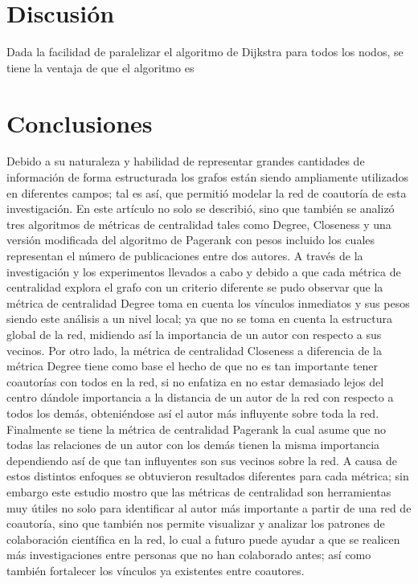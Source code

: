 \documentclass[journal]{IEEEtran}
\begin{document}
\section{Discusión}

Dada la facilidad de paralelizar el algoritmo de Dijkstra para todos los nodos, se tiene la ventaja de que el algoritmo es 

\section{Conclusiones}

Debido a su naturaleza y habilidad de representar grandes cantidades de información de forma estructurada los grafos están siendo ampliamente utilizados en diferentes campos; tal es así, que permitió modelar la red de coautoría de esta investigación. 
En este artículo no solo se describió, sino que también se analizó tres algoritmos de métricas de centralidad tales como Degree, Closeness y una versión modificada del algoritmo de Pagerank con pesos incluido los cuales representan el número de publicaciones entre dos autores. 
A través de la investigación y los experimentos llevados a cabo y debido a que cada métrica de centralidad explora el grafo con un criterio diferente se pudo observar que la métrica de centralidad Degree toma en cuenta los vínculos inmediatos y sus pesos siendo este análisis a un nivel local; ya que no se toma en cuenta la estructura global de la red, midiendo así la importancia de un autor con respecto a sus vecinos. Por otro lado, la métrica de centralidad Closeness a diferencia de la métrica Degree tiene como base el hecho de que no es tan importante tener coautorías con todos en la red, si no enfatiza en no estar demasiado lejos del centro dándole importancia a la distancia de un autor de la red con respecto a todos los demás, obteniéndose así el autor más influyente sobre toda la red. Finalmente se tiene la métrica de centralidad Pagerank la cual asume que no todas las relaciones de un autor con los demás tienen la misma importancia dependiendo así de que tan influyentes son sus vecinos sobre la red.
A causa de estos distintos enfoques se obtuvieron resultados diferentes para cada métrica; sin embargo este estudio mostro que las métricas de centralidad son herramientas muy útiles no solo para identificar al autor más importante a partir de una red de coautoría, sino que también nos permite visualizar y analizar los patrones de colaboración científica en la red, lo cual a futuro puede ayudar a que se realicen más investigaciones entre personas que no han colaborado antes; así como también fortalecer los vínculos ya existentes entre coautores.
\end{document}
